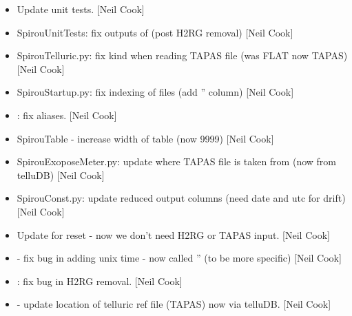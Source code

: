 \documentclass[a4paper,10pt,english]{report}
\begin{document}
\begin{itemize}
\item {} 
Update unit tests. {[}Neil Cook{]}

\item {} 
SpirouUnitTests: fix outputs of  (post H2RG removal) {[}Neil
Cook{]}

\item {} 
SpirouTelluric.py: fix kind when reading TAPAS file (was FLAT now
TAPAS) {[}Neil Cook{]}

\item {} 
SpirouStartup.py: fix indexing of files (add ” column)
{[}Neil Cook{]}

\item {} 
: fix aliases. {[}Neil Cook{]}

\item {} 
SpirouTable - increase width of table (now 9999) {[}Neil Cook{]}

\item {} 
SpirouExoposeMeter.py: update where TAPAS file is taken from (now from
telluDB) {[}Neil Cook{]}

\item {} 
SpirouConst.py: update reduced output columns (need date and utc for
drift) {[}Neil Cook{]}

\item {} 
Update  for reset - now we don’t need H2RG or
TAPAS input. {[}Neil Cook{]}

\item {} 
 - fix bug in adding unix time - now
called ” (to be more specific) {[}Neil Cook{]}

\item {} 
: fix bug in H2RG removal. {[}Neil Cook{]}

\item {} 
 - update location of telluric ref
file (TAPAS) now via telluDB. {[}Neil Cook{]}

\end{itemize}
\end{document}
